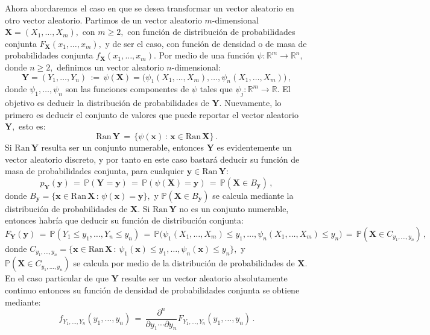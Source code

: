 \documentclass[spanish,10pt,letterpaper]{article}
\newcommand{\prob}{\mathbb{P}}
\newcommand{\Runo}{\mathbb{R}}
\begin{document}
\bigskip 


Ahora abordaremos el caso en que se desea transformar un vector aleatorio en otro vector aleatorio. Partimos de un vector aleatorio $m$-dimensional $\mathbf{X}=(X_1,\ldots,X_m),$ con $m\geq 2,$ con función de distribución de probabilidades conjunta $F_{\mathbf{X}}(x_1,\ldots,x_m),$ y de ser el caso, con función de densidad o de masa de probabilidades conjunta $f_{\mathbf{X}}(x_1,\ldots,x_m).$ Por medio de una función $\psi:\Runo^m\rightarrow\Runo^{n},$ donde $n\geq 2,$ definimos un vector aleatorio $n$-dimensional:
\begin{equation}\label{eq:transfvecvec}
    \mathbf{Y} = (Y_1,\ldots,Y_n) \,:=\, \psi(\mathbf{X}) = \big(\psi_1(X_1,\ldots,X_m),\ldots,\psi_n(X_1,\ldots,X_m)\big)\,, 
\end{equation}
donde $\psi_1,\ldots,\psi_n$ son las funciones componentes de $\psi$ tales que $\psi_j:\Runo^m\rightarrow\Runo.$ El objetivo es deducir la distribución de probabilidades de $\mathbf{Y}.$ Nuevamente, lo primero es deducir el conjunto de valores que puede reportar el vector aleatorio $\mathbf{Y},$ esto es:
$$\text{Ran}\,\mathbf{Y} \,=\, \{\psi(\mathbf{x})\,:\,\mathbf{x}\in\text{Ran}\,\mathbf{X}\}\,.$$
Si $\text{Ran}\,\mathbf{Y}$ resulta ser un conjunto numerable, entonces $\mathbf{Y}$ es evidentemente un vector aleatorio discreto, y por tanto en este caso bastará deducir su función de masa de probabilidades conjunta, para cualquier $\mathbf{y}\in\text{Ran}\,\mathbf{Y}:$
\begin{equation}\label{eq:fmpvecvec}
     p_{\mathbf{Y}}(\mathbf{y}) \,=\, \prob(\mathbf{Y}=\mathbf{y}) \,=\, \prob(\psi(\mathbf{X})=\mathbf{y}) \,=\, \prob(\mathbf{X}\in B_{\mathbf{y}})\,,
\end{equation}
donde $B_{\mathbf{y}}=\{\mathbf{x}\in\text{Ran}\,\mathbf{X}\,:\,\psi(\mathbf{x})=\mathbf{y}\},$ y $\prob(\mathbf{X}\in B_{\mathbf{y}})$ se calcula mediante la distribución de probabilidades de $\mathbf{X}.$ Si $\text{Ran}\,\mathbf{Y}$ no es un conjunto numerable, entonces habría que deducir su función de distribución conjunta:
\begin{equation}\label{eq:Fvecvec}
     F_{\mathbf{Y}}(\mathbf{y}) \,=\, \prob(Y_1\leq y_1,\ldots,Y_n\leq y_n) \,=\, \prob\big(\psi_1(X_1,\ldots,X_m)\leq y_1,\ldots,\psi_n(X_1,\ldots,X_m)\leq y_n\big) \,=\, \prob(\mathbf{X}\in C_{y_1,\ldots,y_n})\,,
\end{equation}
donde $C_{y_1,\ldots,y_n}=\{\mathbf{x}\in\text{Ran}\,\mathbf{X}\,:\,\psi_1(\mathbf{x})\leq y_1,\ldots,\psi_n(\mathbf{x})\leq y_n\},$ y $\prob(\mathbf{X}\in C_{y_1,\ldots,y_n})$ se calcula por medio de la distribución de probabilidades de $\mathbf{X}.$ En el caso particular de que $\mathbf{Y}$ resulte ser un vector aleatorio absolutamente continuo entonces su función de densidad de probabilidades conjunta se obtiene mediante:
\begin{equation}\label{eq:fdpvecvec}
    f_{Y_1,\ldots,Y_n}(y_1,\ldots,y_n) \,=\, \frac{\partial^n}{\partial y_1 \cdots\partial y_n}F_{Y_1,\ldots,Y_n}(y_1,\ldots,y_n)\,.
\end{equation}
\end{document}
